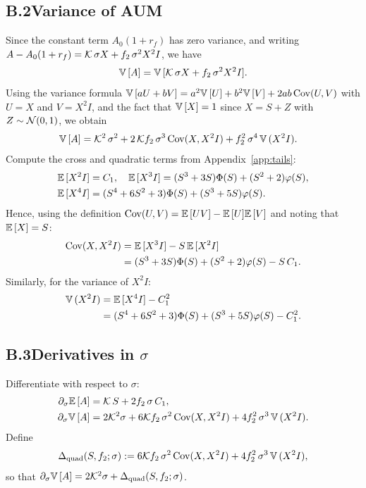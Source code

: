 \subsection*{B.2\quad Variance of AUM}
Since the constant term $A_0(1+r_f)$ has zero variance, and writing $A - A_0(1+r_f) = \mathcal{K}\,\sigma X + f_2\,\sigma^2 X^2 I$, we have
\[
{\mathbb{V}}\,[A] = {\mathbb{V}}\,[\mathcal{K}\,\sigma X + f_2\,\sigma^2 X^2 I].
\]
Using the variance formula ${\mathbb{V}}\,[aU+bV]=a^2{\mathbb{V}}\,[U]+b^2{\mathbb{V}}\,[V]+2ab\,{\mathrm{Cov}}(U,V)$ with $U=X$ and $V=X^2 I$, and the fact that ${\mathbb{V}}\,[X]=1$ since $X=S+Z$ with $Z\sim\mathcal{N}(0,1)$, we obtain
\begin{align}
{\mathbb{V}}\,[A] &= \mathcal{K}^2\,\sigma^2 + 2\,\mathcal{K} f_2\,\sigma^3\,{\mathrm{Cov}}(X, X^2 I) + f_2^2\,\sigma^4\,{\mathbb{V}}\,(X^2 I).\label{eq:VarA-app}
\end{align}
Compute the cross and quadratic terms from Appendix~\ref{app:tails}:
\begin{align}
{\mathbb{E}}\,[X^2 I] &= C_1,\quad {\mathbb{E}}\,[X^3 I] = (S^3+3S)\Phi(S) + (S^2+2)\varphi(S),\label{eq:X3}\\
{\mathbb{E}}\,[X^4 I] &= (S^4+6S^2+3)\Phi(S) + (S^3+5S)\varphi(S).\label{eq:X4}
\end{align}
Hence, using the definition ${\mathrm{Cov}}(U,V)={\mathbb{E}}\,[UV]-{\mathbb{E}}\,[U]{\mathbb{E}}\,[V]$ and noting that ${\mathbb{E}}\,[X]=S$:
\begin{align}
{\mathrm{Cov}}(X, X^2 I) &= {\mathbb{E}}\,[X^3 I] - S\,{\mathbb{E}}\,[X^2 I] \nonumber\\
&= (S^3+3S)\Phi(S) + (S^2+2)\varphi(S) - S\,C_1.\label{eq:Cov}
\end{align}
Similarly, for the variance of $X^2 I$:
\begin{align}
{\mathbb{V}}\,(X^2 I) &= {\mathbb{E}}\,[X^4 I] - C_1^2 \nonumber\\
&= (S^4+6S^2+3)\Phi(S) + (S^3+5S)\varphi(S) - C_1^2.\label{eq:VarX2I}
\end{align}

\subsection*{B.3\quad Derivatives in $\sigma$}
Differentiate with respect to $\sigma$:
\begin{align}
\partial_\sigma {\mathbb{E}}\,[A] &= \mathcal{K}\,S + 2 f_2\,\sigma\,C_1,\label{eq:dEA-app}\\
\partial_\sigma {\mathbb{V}}\,[A] &= 2\mathcal{K}^2\sigma + 6\mathcal{K} f_2\,\sigma^2\,{\mathrm{Cov}}(X, X^2 I) + 4 f_2^2\,\sigma^3\,{\mathbb{V}}\,(X^2 I).\label{eq:dVarA-app}
\end{align}
Define
\begin{equation}
\Delta_{\text{quad}}(S,f_2;\sigma):=6\mathcal{K} f_2\,\sigma^2\,{\mathrm{Cov}}(X, X^2 I) + 4 f_2^2\,\sigma^3\,{\mathbb{V}}\,(X^2 I),\label{eq:DeltaQuad}
\end{equation}
so that $\partial_\sigma {\mathbb{V}}\,[A]=2\mathcal{K}^2\sigma+\Delta_{\text{quad}}(S,f_2;\sigma)$.


